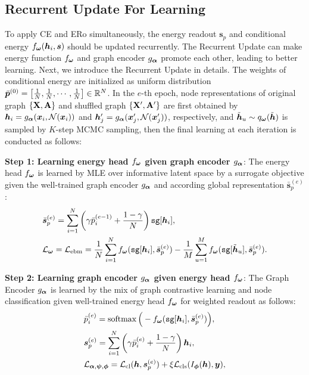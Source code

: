 \subsection{Recurrent Update For Learning \shortname}
\label{sec:recur_update}
To apply CE and ERo simultaneously, the energy readout $\bm{s}_p$ and conditional energy $f_{{\bm{\omega}}} ({\bm{h}}_i, \bm{s})$ should be updated recurrently. The Recurrent Update can make energy function $f_{{\bm{\omega}}}$ and graph encoder $g_{\bm{\alpha}}$ promote each other, leading to better learning.
Next, we introduce the Recurrent Update in details. The weights of conditional energy are initialized as uniform distribution $\bar{\bm{p}}^{(0)} = \left[ \frac{1}{N}, \frac{1}{N}, \cdots, \frac{1}{N} \right] \in \mathbb{R}^{N}$. 
In the $e$-th epoch, node representations of original graph $\{ \mathbf{X}, \mathbf{A} \}$ and shuffled graph $\{ \mathbf{X}', \mathbf{A}' \}$ are first obtained by ${\bm{h}}_i = g_{\bm{\alpha}}( {\bm{x}}_i, \mathcal{N}({\bm{x}}_i) )$ and ${\bm{h}}'_j = g_{\bm{\alpha}}( {\bm{x}}'_j, \mathcal{N}({\bm{x}}'_j) )$, respectively, and $\Tilde{{\bm{h}}}_u\sim q_{{\bm{\omega}}}(\Tilde{{\bm{h}}})$ is sampled by $K$-step MCMC sampling, then the final learning at each iteration is conducted as follows:


\noindent\textbf{Step 1: Learning energy head $f_{{\bm{\omega}}}$ given graph encoder $g_{{\bm{\alpha}}}$}:
The energy head $f_{{\bm{\omega}}}$ is learned by MLE over informative latent space by a surrogate objective given the well-trained graph encoder $g_{{\bm{\alpha}}}$ and according global representation $\bar{\bm{s}}_p^{(e)}$:
\vspace{-5pt}
\begin{equation*}
\begin{aligned}
    &\bar{\bm{s}}_p^{(e)} = \sum_{i=1}^{N} \left( \gamma\bar{p}_i^{(e-1)} + \frac{1-\gamma}{N} \right) \texttt{sg}[{\bm{h}}_i], \\
    &\mathcal{L}_{{\bm{\omega}}} = \mathcal{L}_{\text{ebm}} = \frac{1}{N}\sum_{i=1}^{N} f_{{\bm{\omega}}}(\texttt{sg}[ {\bm{h}}_i ], \bar{\bm{s}}_p^{(e)}) - \frac{1}{M}\sum_{u=1}^{M} f_{{\bm{\omega}}}(\texttt{sg}[\Tilde{{\bm{h}}}_u], \bar{\bm{s}}_p^{(e)}). 
\end{aligned}
\end{equation*}
\vspace{-10pt}


\noindent\textbf{Step 2: Learning graph encoder $g_{{\bm{\alpha}}}$ given energy head $f_{{\bm{\omega}}}$}:
The Graph Encoder $g_{{\bm{\alpha}}}$ is learned by the mix of graph contrastive learning and node classification given well-trained energy head $f_{{\bm{\omega}}}$ for weighted readout as follows:
\vspace{-5pt}
\begin{equation*}
\begin{aligned}
    &\bar{p}_i^{(e)} = \operatorname{softmax} \Big( - f_{{\bm{\omega}}}(\texttt{sg}[ {\bm{h}}_i ], \bar{\bm{s}}_p^{(e)}) \Big), \\
    &\bm{s}_p^{(e)} = \sum_{i=1}^{N} \left( \gamma\bar{p}_i^{(e)} + \frac{1-\gamma}{N} \right) {\bm{h}}_i, \\
    & \mathcal{L}_{{\bm{\alpha}},{\bm{\psi}},{\bm{\phi}}} = \mathcal{L}_{\text{cl}}({\bm{h}},\bm{s}_p^{(e)}) + \xi \mathcal{L}_{\text{cls}}(I_{{\bm{\phi}}}({\bm{h}}), {\bm{y}}), 
\end{aligned}
\end{equation*}
\vspace{-10pt}

